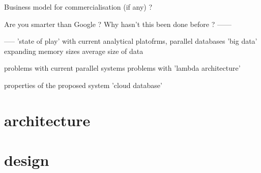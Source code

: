 \documentclass[12pt]{article}
\begin{document}
Business model for commercialisation (if any) ?

Are you smarter than Google ? Why hasn’t this been done before ?
------





-----
'state of play' with current analytical platofrms, parallel databases
'big data'
expanding memory sizes
average size of data 

problems with current parallel systems
problems with 'lambda architecture'

properties of the proposed system
'cloud database'


\section{architecture}
\section{design}
\end{document}
